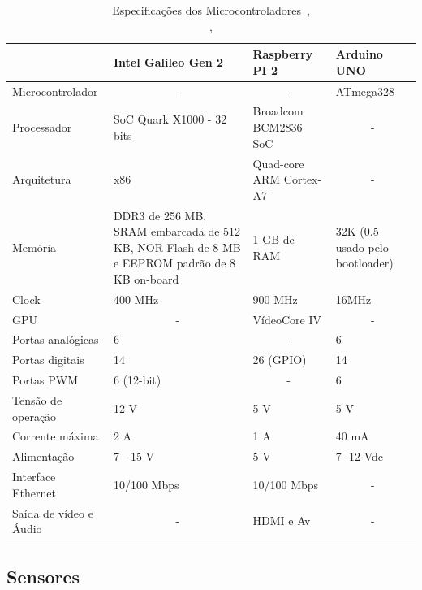 \begin{table}[H]
\centering
\begin{tabular}{p{3cm}|p{3cm}|p{3cm}|p{3cm}|}
\cline{2-4}
 & Intel Galileo Gen 2 & Raspberry PI 2 & Arduino UNO \\ \hline
\multicolumn{1}{|l|}{Microcontrolador} & \multicolumn{1}{c|}{-} & \multicolumn{1}{c|}{-} & ATmega328 \\ \hline
\multicolumn{1}{|l|}{Processador} & SoC Quark X1000 - 32 bits & Broadcom BCM2836 SoC & \multicolumn{1}{c|}{-} \\ \hline
\multicolumn{1}{|l|}{Arquitetura} & x86 & Quad-core ARM Cortex-A7 & \multicolumn{1}{c|}{-} \\ \hline
\multicolumn{1}{|l|}{Memória} & DDR3 de 256 MB, SRAM embarcada de 512 KB, NOR Flash de 8 MB e EEPROM padrão de 8 KB on-board & 1 GB de RAM & 32K (0.5 usado pelo bootloader) \\ \hline
\multicolumn{1}{|l|}{Clock} & 400 MHz & 900 MHz & 16MHz \\ \hline
\multicolumn{1}{|l|}{GPU} & \multicolumn{1}{c|}{-} & VídeoCore IV & \multicolumn{1}{c|}{-} \\ \hline
\multicolumn{1}{|l|}{Portas analógicas} & 6 & \multicolumn{1}{c|}{-} & 6 \\ \hline
\multicolumn{1}{|l|}{Portas digitais} & 14 & 26 (GPIO) & 14 \\ \hline
\multicolumn{1}{|l|}{Portas PWM} & 6 (12-bit) & \multicolumn{1}{c|}{-} & 6 \\ \hline
\multicolumn{1}{|l|}{Tensão de operação} & 12 V & 5 V & 5 V \\ \hline
\multicolumn{1}{|l|}{Corrente máxima} & 2 A & 1 A & 40 mA \\ \hline
\multicolumn{1}{|l|}{Alimentação} & 7 - 15 V & 5 V & 7 -12 Vdc \\ \hline
\multicolumn{1}{|l|}{Interface Ethernet} & 10/100 Mbps & 10/100 Mbps & \multicolumn{1}{c|}{-} \\ \hline
\multicolumn{1}{|l|}{Saída de vídeo e Áudio} & \multicolumn{1}{c|}{-} & HDMI e Av & \multicolumn{1}{c|}{-} \\ \hline
\end{tabular}
\caption[Especificações dos microcontroladores]{Especificações dos Microcontroladores~\cite{intelGalileo},\\\cite{rsppi}, \cite{arduino}}
\label{table:microprocessadores}
\end{table}

\subsection{Sensores}

